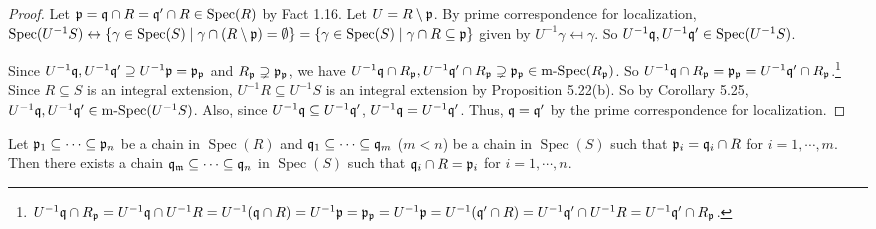 \begin{proof}
    Let $\mathfrak{p} = \mathfrak{q} \cap R = \mathfrak{q}' \cap R \in \operatorname{Spec}(R)$ by Fact 1.16. Let $U = R \setminus \mathfrak{p}$. By prime correspondence for localization, $\operatorname{Spec}(U^{-1}S) \leftrightarrow \{\gamma \in \operatorname{Spec}(S) \mid \gamma \cap (R\setminus \mathfrak{p}) = \emptyset\} = \{\gamma \in \operatorname{Spec}(S) \mid \gamma \cap R \subseteq \mathfrak{p}\}$ given by $U^{-1}\gamma \mapsfrom \gamma$. So $U^{-1}\mathfrak{q},U^{-1}\mathfrak{q}' \in \operatorname{Spec}(U^{-1}S)$. 
    \begin{center}
    \end{center}
    Since $U^{-1}\mathfrak{q}, U^{-1}\mathfrak{q}' \supseteq U^{-1}\mathfrak{p} = \mathfrak{p}_{\mathfrak{p}}$ and $R_{\mathfrak{p}} \supsetneq \mathfrak{p}_{\mathfrak{p}}$, we have $U^{-1}\mathfrak{q} \cap R_{\mathfrak{p}}, U^{-1}\mathfrak{q}' \cap R_{\mathfrak{p}} \supsetneq \mathfrak{p}_{\mathfrak{p}} \in \operatorname{m-Spec}(R_{\mathfrak{p}})$. So $U^{-1}\mathfrak{q} \cap R_{\mathfrak{p}} = \mathfrak{p}_{\mathfrak{p}} = U^{-1}\mathfrak{q}' \cap R_{\mathfrak{p}}$.\footnote[2]{$U^{-1}\mathfrak{q} \cap R_{\mathfrak{p}} = U^{-1}\mathfrak{q} \cap U^{-1}R = U^{-1}(\mathfrak{q} \cap R) = U^{-1}\mathfrak{p} = \mathfrak{p}_{\mathfrak{p}} = U^{-1}\mathfrak{p} = U^{-1}(\mathfrak{q}' \cap R) = U^{-1}\mathfrak{q}' \cap U^{-1}R = U^{-1}\mathfrak{q}' \cap R_{\mathfrak{p}}$.} Since $R \subseteq S$ is an integral extension, $U^{-1}R \subseteq U^{-1}S$ is an integral extension by Proposition 5.22(b). So by Corollary 5.25, $U^{-1}\mathfrak{q},U^{-1}\mathfrak{q}' \in \operatorname{m-Spec}(U^{-1}S)$. Also, since $U^{-1}\mathfrak{q} \subseteq U^{-1}\mathfrak{q}'$, $U^{-1}\mathfrak{q} = U^{-1}\mathfrak{q}'$. Thus, $\mathfrak{q} = \mathfrak{q}'$ by the prime correspondence for localization.
\end{proof}

\begin{theorem}
    Let $\mathfrak{p}_1 \subseteq \cdots \subseteq \mathfrak{p}_n$ be a chain in $\operatorname{Spec}(R)$ and $\mathfrak{q}_1 \subseteq \cdots \subseteq \mathfrak{q}_m$ ($m < n$) be a chain in $\operatorname{Spec}(S)$ such that $\mathfrak{p}_i = \mathfrak{q}_i \cap R$ for $i = 1,\cdots,m$. Then there exists a chain $\mathfrak{q}_{\mathfrak{m}} \subseteq \cdots \subseteq \mathfrak{q}_n$ in $\operatorname{Spec}(S)$ such that $\mathfrak{q}_i \cap R = \mathfrak{p}_i$ for $i = 1,\cdots,n$.
\end{theorem}

